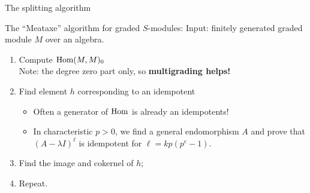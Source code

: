 \documentclass[beamer]{paper}
\begin{document}
{
\begin{frame}
\end{frame}
}


\begin{frame}{The splitting algorithm}
  \begin{alertblock}{The ``Meataxe'' algorithm for graded $S$-modules:}
    Input: finitely generated graded module $M$ over an algebra.
    \pause
    \begin{enumerate}
    \item Compute $\operatorname{Hom}(M, M)_0$ \\ \pause
      Note: the degree zero part only, so \textbf{\color{rossgreen}multigrading helps!} \pause
    \item Find element $h$ corresponding to an idempotent \\ \pause
      \begin{itemize}
      \item Often a generator of $\operatorname{Hom}$ is already an idempotents! \pause
      \item In characteristic $p > 0$, we find a general endomorphism $A$
        and prove that $(A-\lambda I)^\ell$ is idempotent for $\ell = kp(p^e-1)$. \pause
      \end{itemize}
    \item Find the image and cokernel of $h$;
    \item Repeat.
    \end{enumerate}
  \end{alertblock}

\end{frame}
\end{document}
